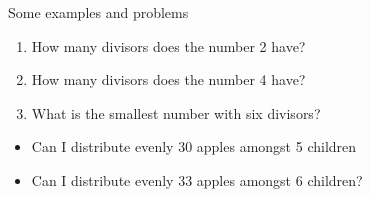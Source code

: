 \documentclass{beamer}
\begin{document}
    \begin{frame}{Some examples and problems}
        \begin{problem}
            \begin{enumerate}
                \item How many divisors does the number 2 have?
                \pause
                \item How many divisors does the number 4 have?
                \pause
                \item What is the smallest number with six divisors?
            \end{enumerate}
        \end{problem}
        \pause
        \begin{problem}
            \begin{itemize}
                \item Can I distribute evenly 30 apples amongst 5 children
                \pause
                \item Can I distribute evenly 33 apples amongst 6 children?
            \end{itemize}
        \end{problem}
    \end{frame}
\end{document}
